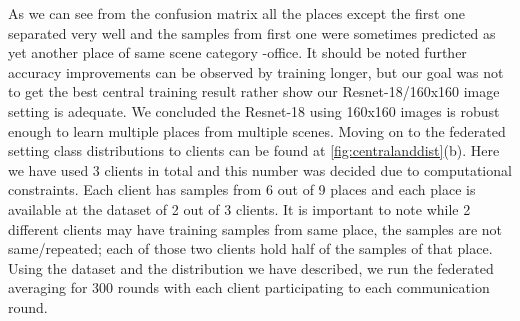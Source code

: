 \documentclass[11pt]{article}
\begin{document}
\par As we can see from the confusion matrix all the places except the first one separated very well and the samples from first one were sometimes predicted as yet another place of same scene category -office. It should be noted further accuracy improvements can be observed by training longer, but our goal was not to get the best central training result rather show our Resnet-18/160x160 image setting is adequate. We concluded the Resnet-18 using 160x160 images is robust enough to learn multiple places from multiple scenes. Moving on to the federated setting class distributions to clients can be found at \ref{fig:centralanddist}{(b)}. Here we have used 3 clients in total and this number was decided due to computational constraints. Each client has samples from 6 out of 9 places and each place is available at the dataset of 2 out of 3 clients. It is important to note while 2 different clients may have training samples from same place, the samples are not same/repeated; each of those two clients hold half of the samples of that place. Using the dataset and the distribution we have described, we run the federated averaging for 300 rounds with each client participating to each communication round.
\end{document}
